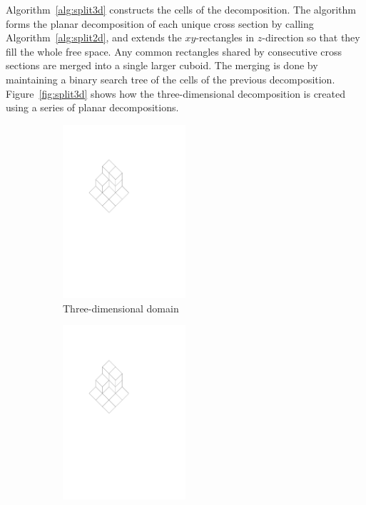 \documentclass[english,gradu]{tktltiki2018}
\begin{document}
Algorithm~\ref{alg:split3d} constructs the cells of the decomposition.
The algorithm forms the planar decomposition of each unique cross section by calling Algorithm~\ref{alg:split2d}, and extends the $xy$-rectangles in $z$-direction so that they fill the whole free space.
Any common rectangles shared by consecutive cross sections are merged into a single larger cuboid.
The merging is done by maintaining a binary search tree of the cells of the previous decomposition.
Figure~\ref{fig:split3d} shows how the three-dimensional decomposition is created using a series of planar decompositions.

\begin{figure}\centering
	\begin{subfigure}[t]{0.3\textwidth}\centering
		\includegraphics[width=0.5\textwidth,page=1]{fig/split3d}
		\caption{Three-dimensional domain}
	\end{subfigure}
	\hfil
	\begin{subfigure}[t]{0.3\textwidth}\centering
		\includegraphics[width=0.5\textwidth,page=3]{fig/split3d}

\end{subfigure}
\end{figure}
\end{document}
